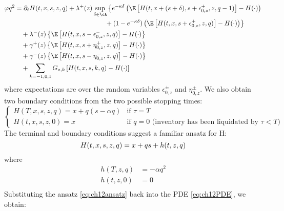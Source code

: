 \documentclass[12pt]{article}
\begin{document}
\begin{equation}\label{eq:ch12PDE}
\begin{split}
\varphi q^2 & = \partial_t H(t,x,s,z,q) + \lambda^+(z)  \sup\limits_{\delta \in \cA} \left\lbrace  e^{ -\kappa \delta } \left( \E \left[ H(t,x + (s + \delta), s + \epsilon^+_{0,z}, z, q-1) \right] - H(\cdot) \right) \right. \\
& \left. \hphantom{\partial_t H(t,x,s,z,q) + \lambda^+(z)  \sup\limits_{\delta \in \cA} \left\lbrace \right.} + (1 - e^{-\kappa \delta}) \left( \E \left[ H(t, x, s+\epsilon^+_{0,z},z,q) \right] - H(\cdot) \right) \right\rbrace \\
& \quad + \lambda^-(z) \left\lbrace \E \left[ H(t,x, s-\epsilon^-_{0,z},z,q) \right] - H(\cdot) \right\rbrace \\
& \quad + \gamma^+(z) \left\lbrace \E \left[ H(t,x, s+\eta^+_{0,z},z,q) \right] - H(\cdot) \right\rbrace \\
& \quad + \gamma^-(z) \left\lbrace \E \left[ H(t,x, s-\eta^-_{0,z},z,q) \right] - H(\cdot) \right\rbrace \\
& \quad + \sum_{k=-1,0,1} G_{z,k} \left[ H(t,x,s,k,q) - H(\cdot) \right]
\end{split}
\end{equation}
where expectations are over the random variables $\epsilon^{\pm}_{0,z}$ and $\eta^{\pm}_{0,z}$. We also obtain two boundary conditions from the two possible stopping times:
\[\begin{cases}
H(T,x,s,z,q) = x + q(s - \alpha q) & \text{if }\tau = T \\
H(t,x,s,z,0) = x & \text{if } q=0 \text{ (inventory has been liquidated by } \tau < T \text{)}
\end{cases}\]
The terminal and boundary conditions suggest a familiar ansatz for H:
\begin{equation}\label{eq:ch12ansatz}
H(t,x,s,z,q) = x + qs + h(t,z,q) \\
\end{equation}
where
\begin{align*}
h(T,z,q) & = -\alpha q^2  \\
h(t,z,0) &  = 0  \\
\end{align*}
Substituting the ansatz \ref{eq:ch12ansatz} back into the PDE \ref{eq:ch12PDE}, we obtain:
\end{document}
